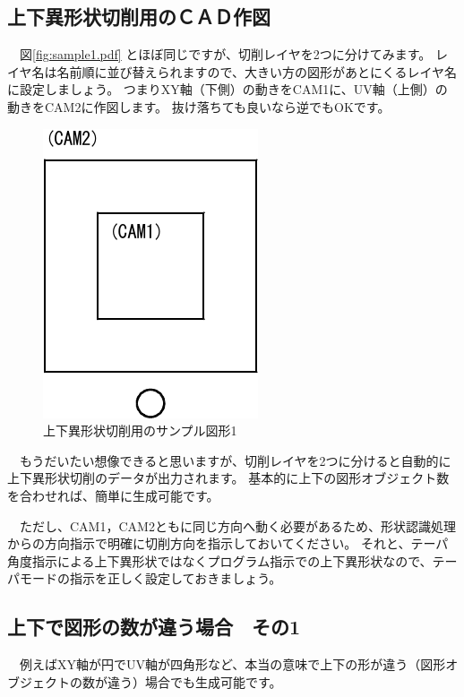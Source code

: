 

\subsection{上下異形状切削用のＣＡＤ作図}
　図\ref{fig:sample1.pdf} とほぼ同じですが、切削レイヤを2つに分けてみます。
レイヤ名は名前順に並び替えられますので、大きい方の図形があとにくるレイヤ名に設定しましょう。
つまりXY軸（下側）の動きをCAM1に、UV軸（上側）の動きをCAM2に作図します。
抜け落ちても良いなら逆でもOKです。

\begin{figure}[H]
\centering
\includegraphics{No2/fig/sample2-crop.pdf}
\caption{上下異形状切削用のサンプル図形1}
\label{fig:sample2.pdf}
\end{figure}

　もうだいたい想像できると思いますが、切削レイヤを2つに分けると自動的に上下異形状切削のデータが出力されます。
基本的に上下の図形オブジェクト数を合わせれば、簡単に生成可能です。


　ただし、CAM1，CAM2ともに同じ方向へ動く必要があるため、形状認識処理からの方向指示で明確に切削方向を指示しておいてください。
それと、テーパ角度指示による上下異形状ではなくプログラム指示での上下異形状なので、テーパモードの指示を正しく設定しておきましょう。

\subsection{上下で図形の数が違う場合　その1}
　例えばXY軸が円でUV軸が四角形など、本当の意味で上下の形が違う（図形オブジェクトの数が違う）場合でも生成可能です。

